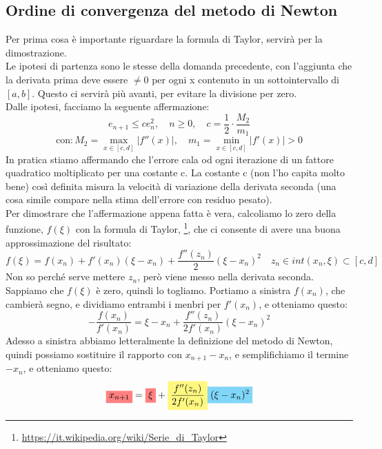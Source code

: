 \subsection{Ordine di convergenza del metodo di Newton}
Per prima cosa è importante riguardare la formula di Taylor, servirà per la dimostrazione.\\
Le ipotesi di partenza sono le stesse della domanda precedente, con l'aggiunta che la derivata prima deve essere $\neq 0$ per ogni x contenuto in un sottointervallo di $[a,b]$. Questo ci servirà più avanti, per evitare la divisione per zero.\\
Dalle ipotesi, facciamo la seguente affermazione:
\begin{displaymath}
    e_{n+1}\leq c e^2_n, \quad n \geq 0, \quad c=\frac{1}{2}\cdot \frac{M_2}{m_1}
\end{displaymath}
\begin{displaymath}
    \text{con}: M_2=\max_{x \in [c,d]}|f''(x)|, \quad m_1=\min_{x \in [c,d]}|f'(x)|>0
\end{displaymath}
In pratica stiamo affermando che l'errore cala od ogni iterazione di un fattore quadratico moltiplicato per una costante c. La costante c (non l'ho capita molto bene) così definita misura la velocità di variazione della derivata seconda (una cosa simile compare nella stima dell'errore con residuo pesato).\\
Per dimostrare che l'affermazione appena fatta è vera, calcoliamo lo zero della funzione, $f(\xi)$ con la formula di Taylor, \footnote[2]{\url{https://it.wikipedia.org/wiki/Serie_di_Taylor}}, che ci consente di avere una buona approssimazione del risultato:
\begin{displaymath}
    f(\xi)=f(x_n)+f'(x_n)(\xi - x_n)+\frac{f''(z_n)}{2}(\xi - x_n)^2 \quad z_n \in int(x_n,\xi) \subset [c,d]
\end{displaymath}
Non so perché serve mettere $z_n$, però viene messo nella derivata seconda.\\
Sappiamo che $f(\xi)$ è zero, quindi lo togliamo. Portiamo a sinistra $f(x_n)$, che cambierà segno, e dividiamo entrambi i menbri per $f'(x_n)$, e otteniamo questo:
\begin{displaymath}
    -\frac{f(x_n)}{f'(x_n)}=\xi - x_n + \frac{f''(z_n)}{2f'(x_n)}(\xi - x_n)^2
\end{displaymath}
Adesso a sinistra abbiamo letteralmente la definizione del metodo di Newton, quindi possiamo sostituire il rapporto con $x_{n+1}-x_n$, e semplifichiamo il termine $-x_n$, e otteniamo questo:
\begin{displaymath}
    \highlightRED{x_{n+1}}=\highlightRED{\xi} + \highlightYELLOW{\frac{f''(z_n)}{2f'(x_n)}}\highlightCYAN{(\xi - x_n)^2}
\end{displaymath}
